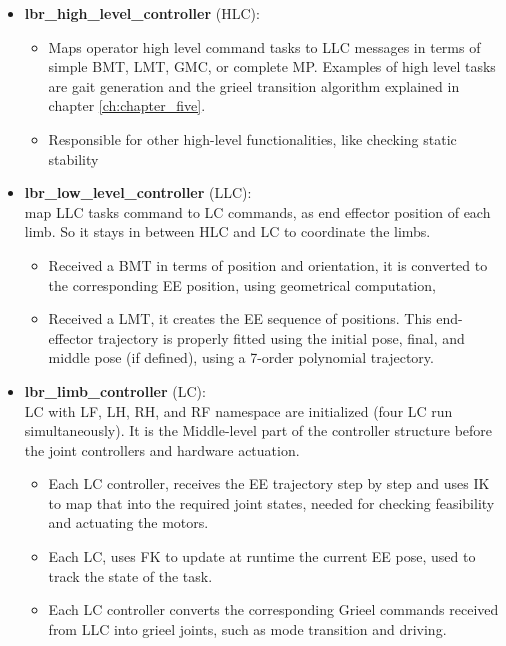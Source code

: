 \begin{itemize}
\begin{itemize}
        position.
        \item [-] Estimate support pattern from contact state and limb-tip position
    \end{itemize}
\item \textbf{lbr\_high\_level\_controller} (HLC):
\begin{itemize}
        \setlength\itemsep{-0.7em} 
        \item[-] Maps operator high level command tasks to LLC messages in terms of simple BMT, LMT, GMC, or complete MP. Examples of high level tasks are gait generation and the grieel transition algorithm explained in chapter \ref{ch:chapter_five}.
        \item [-] Responsible for other high-level functionalities, like checking static stability 
\end{itemize}
\item \textbf{lbr\_low\_level\_controller} (LLC): \\
map LLC tasks command to LC commands, as end effector position of each limb. So it stays in between HLC and LC to coordinate the limbs. 
    \begin{itemize}
    \setlength\itemsep{-0.7em} 
        \item [-] Received a BMT in terms of position and orientation, it is converted to the corresponding EE position, using geometrical computation, 
        \item [-] Received a LMT, it creates the EE sequence of positions. This end-effector trajectory is properly fitted using the initial pose, final, and middle pose (if defined), using a 7-order polynomial trajectory.
    \end{itemize}  
\item \textbf{lbr\_limb\_controller} (LC): \\
LC with LF, LH, RH, and RF namespace are initialized (four LC run simultaneously).  
It is the Middle-level part of the controller structure before the joint controllers and hardware actuation.
    \begin{itemize}
    \setlength\itemsep{-0.7em} 
        \item [-] Each LC controller, receives the EE trajectory step by step and uses IK to map that into the required joint states, needed for checking feasibility and actuating the motors. 
        \item [-] Each LC, uses FK to update at runtime the current EE pose, used to track the state of the task.
        \item [-] Each LC controller converts the corresponding Grieel commands received from LLC into grieel joints, such as mode transition and driving.   

\end{itemize}
\end{itemize}
